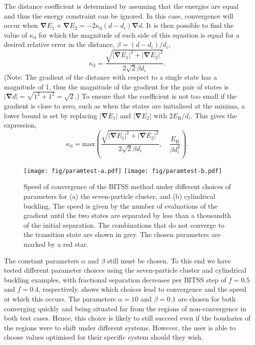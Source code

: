 \documentclass[aip,jcp,11pt]{revtex4-2}
\newcommand{\abs}[1]{\left| #1 \right|}
\newcommand{\grad}{\bm{\nabla}}
\begin{document}
The distance coefficient is determined by assuming that the energies are equal and thus the energy constraint can be ignored.
In this case, convergence will occur when $\grad E_1 + \grad E_2 = -2 \kappa_\text{d} (d - d_i) \grad d$.
It is then possible to find the value of $\kappa_\text{d}$ for which the magnitude of each side of this equation is equal for a desired relative error in the distance, $\beta = (d - d_i) / d_i$,
\begin{equation}
  \kappa_\text{d} = \frac {\sqrt{\abs{\grad E_1}^2 + \abs{\grad E_2}^2}} {2 \sqrt{2} \beta d_i}.
\end{equation}
(Note: The gradient of the distance with respect to a single state has a magnitude of 1, thus the magnitude of the gradient for the pair of states is $\abs{\grad d} = \sqrt{1^2+1^2} = \sqrt{2}$.)
To ensure that the coefficient is not too small if the gradient is close to zero, such as when the states are initialised at the minima, a lower bound is set by replacing $\abs{\grad E_1}$ and $\abs{\grad E_2}$ with $2 E_\text{B} / d_i$. This gives the expression,
\begin{equation}
  \kappa_\text{d} = \mathrm{max} \! \left(
  \frac {\sqrt{\abs{\grad E_1}^2 + \abs{\grad E_2}^2}} {2 \sqrt{2} \beta d_i}, \quad
  \frac{E_\text{B}}{\beta d_i^2} \right).
\end{equation}

\begin{figure}[htb]
  \texttt{[image: fig/paramtest-a.pdf]}%
  \texttt{[image: fig/paramtest-b.pdf]}%
  \caption{\label{fig:paramtest}
    Speed of convergence of the BITSS method under different choices of parameters for (a) the seven-particle cluster, and (b) cylindrical buckling.
    The speed is given by the number of evaluations of the gradient until the two states are separated by less than a thousandth of the initial separation.
    The combinations that do not converge to the transition state are shown in grey.
    The chosen parameters are marked by a red star.
  }
\end{figure}

The constant parameters $\alpha$ and $\beta$ still must be chosen.
To this end we have tested different parameter choices using the seven-particle cluster and cylindrical buckling examples, with fractional separation decreases per BITSS step of $f=0.5$ and $f=0.4$, respectively.
 shows which choices lead to convergence and the speed at which this occurs.
The parameters $\alpha = 10$ and $\beta = 0.1$ are chosen for both converging quickly and being situated far from the regions of non-convergence in both test cases.
Hence, this choice is likely to still succeed even if the boudaries of the regions were to shift under different systems.
However, the user is able to choose values optimised for their specific system should they wish.
\end{document}
